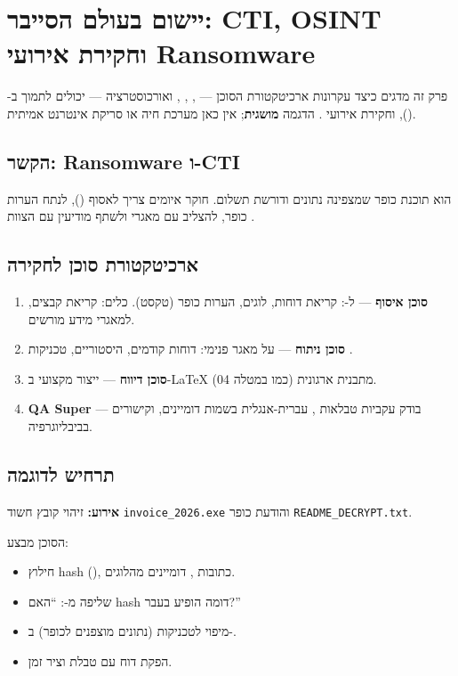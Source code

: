 \section{יישום בעולם הסייבר: CTI, OSINT וחקירת אירועי Ransomware}

פרק זה מדגים כיצד עקרונות ארכיטקטורת הסוכן --- , ,
,  ואורכוסטרציה --- יכולים לתמוך ב- (),  וחקירת אירועי .
הדגמה \textbf{מושגית}; אין כאן מערכת  חיה או סריקת אינטרנט אמיתית.

\subsection{הקשר: Ransomware ו-CTI}

 הוא תוכנת כופר שמצפינה נתונים ודורשת תשלום. חוקר איומים
צריך לאסוף  (), לנתח הערות כופר,
להצליב עם מאגרי  \cite{mitre2024attack} ולשתף מודיעין
עם הצוות \cite{nist2018cti}.

\subsection{ארכיטקטורת סוכן לחקירה}

\begin{enumerate}[rightmargin=2em]
  \item \textbf{סוכן איסוף} ---  ל-: קריאת דוחות, לוגים,
    הערות כופר (טקסט). כלים: קריאת קבצים,  למאגרי מידע מורשים.
  \item \textbf{סוכן ניתוח} ---  על מאגר פנימי: דוחות קודמים,
     היסטוריים, טכניקות .
  \item \textbf{סוכן דיווח} --- ייצור  מקצועי ב-\LaTeX{} מתבנית
     ארגונית (כמו במטלה 04).
  \item \textbf{QA Super} --- בודק עקביות טבלאות , עברית-אנגלית
    בשמות דומיינים, וקישורים בביבליוגרפיה.
\end{enumerate}

\subsection{תרחיש לדוגמה}

\textbf{אירוע:} זיהוי קובץ חשוד \texttt{invoice\_2026.exe} והודעת כופר
\texttt{README\_DECRYPT.txt}.

הסוכן מבצע:
\begin{itemize}[rightmargin=2em]
  \item חילוץ hash (), כתובות , דומיינים מהלוגים.
  \item שליפה מ-: ``האם hash דומה הופיע בעבר?''
  \item מיפוי לטכניקות  (נתונים מוצפנים לכופר) ב-.
  \item הפקת דוח  עם טבלת  וציר זמן.
\end{itemize}

